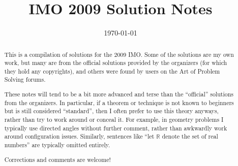 \documentclass[11pt]{scrartcl}
\title{IMO 2009 Solution Notes}
\date{\today}
\begin{document}
\maketitle

\begin{abstract}
This is a compilation of solutions
for the 2009 IMO.
Some of the solutions are my own work,
but many are from the official solutions provided by the organizers
(for which they hold any copyrights),
and others were found by users on the Art of Problem Solving forums.

These notes will tend to be a bit more advanced and terse than the ``official''
solutions from the organizers.
In particular, if a theorem or technique is not known to beginners
but is still considered ``standard'', then I often prefer to
use this theory anyways, rather than try to work around or conceal it.
For example, in geometry problems I typically use directed angles
without further comment, rather than awkwardly work around configuration issues.
Similarly, sentences like ``let $\mathbb{R}$ denote the set of real numbers''
are typically omitted entirely.

Corrections and comments are welcome!
\end{abstract}

\tableofcontents
\newpage

\addtocounter{section}{-1}
\end{document}
